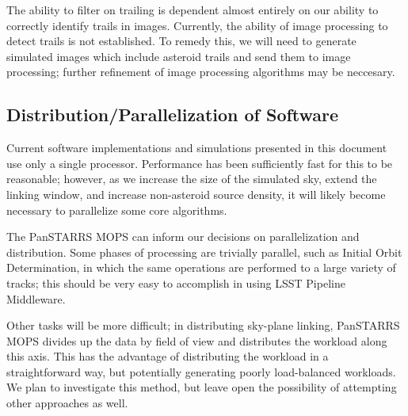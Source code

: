 \documentclass[12pt,preprint]{aastex}
\begin{document}
The ability to filter on trailing is dependent almost entirely on our
ability to correctly identify trails in images.  Currently, the
ability of image processing to detect trails is not established.  To
remedy this, we will need to generate simulated images which include
asteroid trails and send them to image processing; further refinement
of image processing algorithms may be neccesary.



\subsection{Distribution/Parallelization of Software}

Current software implementations and simulations presented in this
document use only a single processor.  Performance has been
sufficiently fast for this to be reasonable; however, as we increase
the size of the simulated sky, extend the linking window, and increase
non-asteroid source density, it will likely become necessary to
parallelize some core algorithms.

The PanSTARRS MOPS can inform our decisions on parallelization and
distribution.  Some phases of processing are trivially parallel, such
as Initial Orbit Determination, in which the same operations are
performed to a large variety of tracks; this should be very easy to
accomplish in using LSST Pipeline Middleware.  

Other tasks will be more difficult; in distributing sky-plane linking,
PanSTARRS MOPS divides up the data by field of view and distributes
the workload along this axis.  This has the advantage of distributing
the workload in a straightforward way, but potentially generating
poorly load-balanced workloads.  We plan to investigate this method,
but leave open the possibility of attempting other approaches as well.




\end{document}
